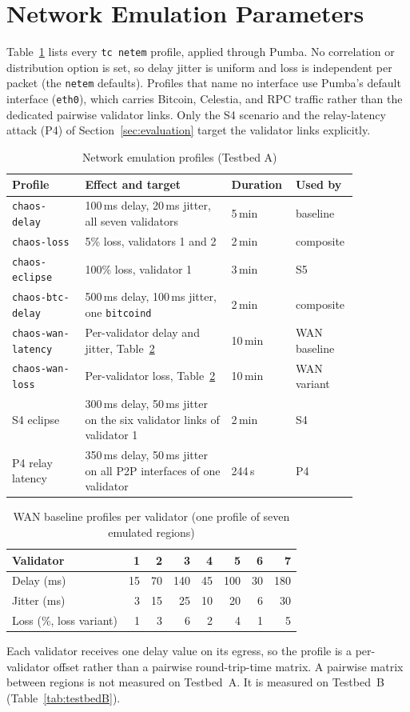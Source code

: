 \section{Network Emulation Parameters}
\label{app:netem}

Table~\ref{tab:netem-profiles} lists every \texttt{tc netem} profile, applied
through Pumba. No correlation or distribution option is set, so delay jitter
is uniform and loss is independent per packet (the \texttt{netem} defaults).
Profiles that name no interface use Pumba's default interface
(\texttt{eth0}), which carries Bitcoin, Celestia, and RPC traffic rather than
the dedicated pairwise validator links. Only the S4 scenario and the relay-latency attack (P4) of
Section~\ref{sec:evaluation} target the validator links explicitly.

\begin{table}[H]
\caption{Network emulation profiles (Testbed A)}
\label{tab:netem-profiles}
\centering
\footnotesize
\begin{tabular}{@{}p{0.2\linewidth}p{0.4\linewidth}p{0.12\linewidth}p{0.14\linewidth}@{}}
\toprule
\textbf{Profile} & \textbf{Effect and target} & \textbf{Duration} & \textbf{Used by} \\
\midrule
\texttt{chaos-delay} & 100\,ms delay, 20\,ms jitter, all seven validators & 5\,min & baseline \\
\texttt{chaos-loss} & 5\% loss, validators 1 and 2 & 2\,min & composite \\
\texttt{chaos-eclipse} & 100\% loss, validator 1 & 3\,min & S5 \\
\texttt{chaos-btc-delay} & 500\,ms delay, 100\,ms jitter, one \texttt{bitcoind} & 2\,min & composite \\
\texttt{chaos-wan-latency} & Per-validator delay and jitter, Table~\ref{tab:netem-wan} & 10\,min & WAN baseline \\
\texttt{chaos-wan-loss} & Per-validator loss, Table~\ref{tab:netem-wan} & 10\,min & WAN variant \\
S4 eclipse & 300\,ms delay, 50\,ms jitter on the six validator links of validator 1 & 2\,min & S4 \\
P4 relay latency & 350\,ms delay, 50\,ms jitter on all P2P interfaces of one validator & 244\,s & P4 \\
\bottomrule
\end{tabular}
\end{table}

\begin{table}[H]
\caption{WAN baseline profiles per validator (one profile of seven emulated regions)}
\label{tab:netem-wan}
\centering
\footnotesize
\begin{tabular}{@{}lrrrrrrr@{}}
\toprule
\textbf{Validator} & 1 & 2 & 3 & 4 & 5 & 6 & 7 \\
\midrule
Delay (ms)  & 15 & 70 & 140 & 45 & 100 & 30 & 180 \\
Jitter (ms) & 3 & 15 & 25 & 10 & 20 & 6 & 30 \\
Loss (\%, loss variant) & 1 & 3 & 6 & 2 & 4 & 1 & 5 \\
\bottomrule
\end{tabular}
\end{table}

Each validator receives one delay value on its egress, so the profile is a
per-validator offset rather than a pairwise round-trip-time matrix. A
pairwise matrix between regions is not measured on Testbed~A.
\iftestbedB It is measured on Testbed~B (Table~\ref{tab:testbedB}).\fi
